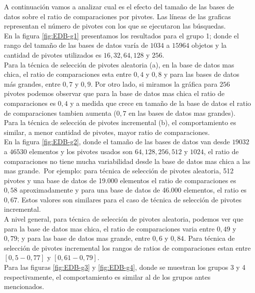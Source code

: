 A continuaci\'on vamos a analizar cual es el efecto del tama\~no de las bases de datos sobre el ratio de comparaciones por pivotes. Las l\'ineas de las graficas representan el n\'umero de pivotes con los que se ejecutaron las b\'usquedas.\\

En la figura \ref{fig:EDB-g1} presentamos los resultados para el grupo 1; donde el rango del tama\~no de las bases de datos varía de $1034$ a $15964$ objetos y la cantidad de pivotes utilizados es $16, 32, 64, 128$ y $256$.\\

Para la t\'ecnica de selecci\'on de pivotes aleatoria (a), en la base de datos mas chica, el ratio de comparaciones esta entre $0,4$ y $0,8$ y para las bases de datos m\'as grandes, entre $0,7$ y $0,9$. Por otro lado, si miramos la gr\'afica para $256$ pivotes podemos observar que para la base de datos mas chica el ratio de comparaciones es $0,4$ y a medida que crece en tama\~no de la base de datos el ratio de comparaciones tambien aumenta ($0,7$ en las bases de datos mas grandes).\\

Para la t\'ecnica de selecci\'on de pivotes incremental (b), el comportamiento es similar, a menor cantidad de pivotes, mayor ratio de comparaciones.\\

En la figura \ref{fig:EDB-g2}, donde el tama\~no de las bases de datos van desde $19032$ a $46530$ elementos y los pivotes usados son $64, 128, 256, 512$ y $1024$, el ratio de comparaciones no tiene mucha variabilidad desde la base de datos mas chica a las mas grande.\
Por ejemplo: para t\'ecnica de selecci\'on de pivotes aleatoria, 512 pivotes y una base de datos de 19.000 elementos el ratio de comparaciones es $0,58$ aproximadamente y para una base de datos de 46.000 elementos, el ratio es $0,67$. Estos valores son similares para el caso de t\'ecnica de selecci\'on de pivotes incremental.\\

A nivel general, para t\'ecnica de selecci\'on de pivotes aleatoria, podemos ver que para la base de datos mas chica, el ratio de comparaciones varia entre $0,49$ y $0,79$; y para las base de datos mas grande, entre $0,6$ y $0,84$. Para t\'ecnica de selecci\'on de pivotes incremental los rangos de ratios de comparaciones estan entre $[0,5 - 0,77]$ y $[0,61 - 0,79]$. \\

Para las figuras \ref{fig:EDB-g3} y \ref{fig:EDB-g4}, donde se muestran los grupos 3 y 4 respectivamente, el comportamiento es similar al de los grupos antes mencionados.\\

